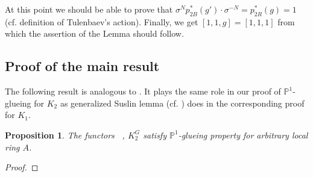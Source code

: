 \documentclass[oneside,12pt]{amsart}
\DeclareRobustCommand{\VAN}[2]{#1}
\numberwithin{equation}{section}
\numberwithin{lem}{section}
\newtheorem{prop}[lem]{Proposition}
\theoremstyle{definition}
\theoremstyle{remark}
\DeclareMathOperator{\St}{St^G}
\newcommand{\Pro}{\mathbb{P}}
\begin{document}
At this point we should be able to prove that $\sigma^N p_{2B}^*(g')\cdot  \sigma^{-N} = p_{2R}^*(g) = 1$ (cf. definition of Tulenbaev's action).
Finally, we get $[1, 1, g] = [1,1,1]$ from which the assertion of the Lemma should follow.

\subsection{Proof of the main result}

The following result is analogous to \cite[Proposition~4.3]{Tu}.
It plays the same role in our proof of $\Pro^1$-glueing for $K_2$ as generalized Suslin lemma (cf. \cite[Theorem~2.16]{Abe}) does in the corresponding proof for $K_1$.
\begin{prop} \label{prop:p1g} The functors $\St$, $K_2^G$ satisfy $\Pro^1$-glueing property for arbitrary local ring $A$.
\end{prop}
\begin{proof}
\end{proof}

\DeclareRobustCommand{\VAN}[2]{#2}
\printbibliography
\end{document}
